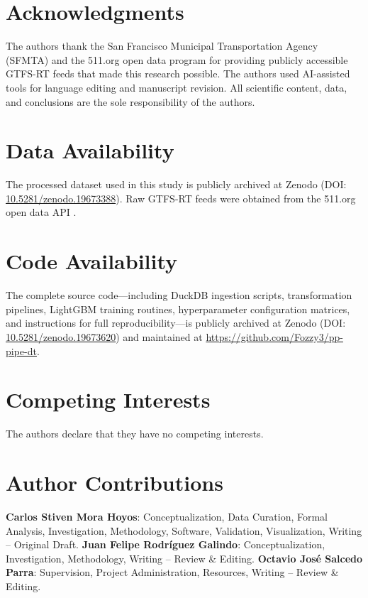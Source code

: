\documentclass[fleqn,10pt,lineno]{wlpeerj}
\begin{document}
\section*{Acknowledgments}

The authors thank the San Francisco Municipal Transportation Agency (SFMTA) and the 511.org
open data program for providing publicly accessible GTFS-RT feeds that made this research
possible. The authors used AI-assisted tools for language editing and manuscript revision. All
scientific content, data, and conclusions are the sole responsibility of the authors.

\section*{Data Availability}

The processed dataset used in this study is publicly archived at Zenodo \citep{39}
(DOI: \href{https://doi.org/10.5281/zenodo.19673388}{10.5281/zenodo.19673388}).
Raw GTFS-RT feeds were obtained from the 511.org open data API \citep{28}.

\section*{Code Availability}

The complete source code---including DuckDB ingestion scripts, transformation pipelines,
LightGBM training routines, hyperparameter configuration matrices, and instructions for
full reproducibility---is publicly archived at Zenodo \citep{38}
(DOI: \href{https://doi.org/10.5281/zenodo.19673620}{10.5281/zenodo.19673620})
and maintained at \url{https://github.com/Fozzy3/pp-pipe-dt}.

\section*{Competing Interests}

The authors declare that they have no competing interests.

\section*{Author Contributions}

\textbf{Carlos Stiven Mora Hoyos}: Conceptualization, Data Curation, Formal Analysis,
Investigation, Methodology, Software, Validation, Visualization, Writing -- Original Draft.
\textbf{Juan Felipe Rodr\'iguez Galindo}: Conceptualization, Investigation, Methodology,
Writing -- Review \& Editing.
\textbf{Octavio Jos\'e Salcedo Parra}: Supervision, Project Administration, Resources,
Writing -- Review \& Editing.


\end{document}
